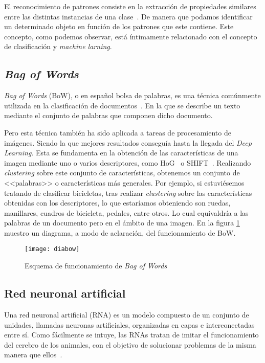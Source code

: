 El reconocimiento de patrones consiste en la extracción de propiedades similares entre las distintas instancias de una clase~\cite{wiki:patternrecognition}. De manera que podamos identificar un determinado objeto en función de los patrones que este contiene. Este concepto, como podemos observar, está íntimamente relacionado con el concepto de clasificación y \textit{machine larning}.

\subsection{\textit{Bag of Words}}
\label{bow}
\textit{Bag of Words} (BoW), o en español bolsa de palabras, es una técnica comúnmente utilizada en la clasificación de documentos~\cite{wiki:bowmodel}. En la que se describe un texto mediante el conjunto de palabras que componen dicho documento.

Pero esta técnica también ha sido aplicada a tareas de procesamiento de imágenes. Siendo la que mejores resultados conseguía hasta la llegada del \textit{Deep Learning}. Esta se fundamenta en la obtención de las características de una imagen mediante uno o varios descriptores, como HoG~\cite{wiki:hog} o SHIFT~\cite{shift}. Realizando \textit{clustering} sobre este conjunto de características, obtenemos un conjunto de <<palabras>> o características más generales. Por ejemplo, si estuviésemos tratando de  clasificar bicicletas, tras realizar \textit{clustering} sobre las características obtenidas con los descriptores, lo que estaríamos obteniendo son ruedas, manillares, cuadros de bicicleta, pedales, entre otros. Lo cual equivaldría a las palabras de un documento pero en el ámbito de una imagen. En la figura \ref{fig:3.1.3.1} muestro un diagrama, a modo de aclaración, del funcionamiento de BoW.

\begin{figure}
\centering
\texttt{[image: diabow]}
\caption{Esquema de funcionamiento de \textit{Bag of Words}}
\label{fig:3.1.3.1}
\end{figure}

\subsection{Red neuronal artificial}

Una red neuronal artificial (RNA) es un modelo compuesto de un conjunto de unidades, llamadas neuronas artificiales, organizadas en capas e interconectadas entre sí. Como fácilmente se intuye, las RNAs tratan de imitar el funcionamiento del cerebro de los animales, con el objetivo de solucionar problemas de la misma manera que ellos~\cite{wiki:ann}.

